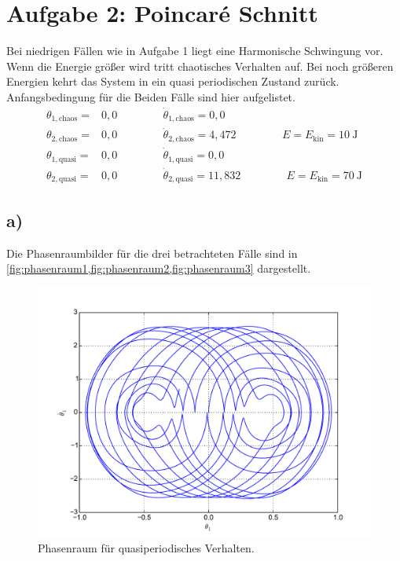 \section*{Aufgabe 2: Poincaré Schnitt}
Bei niedrigen Fällen wie in Aufgabe 1 liegt eine Harmonische Schwingung vor.
Wenn die Energie größer wird tritt chaotisches Verhalten auf.
Bei noch größeren Energien kehrt das System in ein quasi periodischen Zustand zurück.
Anfangsbedingung für die Beiden Fälle sind hier aufgelistet.
\begin{align}
	\theta_{1,\text{chaos}}=&0,0 \hspace{50pt} \dot{\theta}_{1,\text{chaos}}=0,0\nonumber\\
	\theta_{2,\text{chaos}}=&0,0 \hspace{50pt} \dot{\theta}_{2,\text{chaos}}=4,472\hspace{50pt}E=E_\text{kin}=\SI{10}{\joule}\\
	\theta_{1,\text{quasi}}=&0,0 \hspace{50pt} \dot{\theta}_{1,\text{quasi}}=0,0\nonumber\\
	\theta_{2,\text{quasi}}=&0,0 \hspace{50pt} \dot{\theta}_{2,\text{quasi}}=11,832\hspace{50pt}E=E_\text{kin}=\SI{70}{\joule}
\end{align}
\subsection*{a)}
Die Phasenraumbilder für die drei betrachteten Fälle sind in \cref{fig:phasenraum1,fig:phasenraum2,fig:phasenraum3} dargestellt.
\begin{figure}[h!]
	\includegraphics[width = \textwidth]{../Plots/Plot_2_A_1_Phasenraum.pdf}
	\caption{Phasenraum für quasiperiodisches Verhalten.\label{fig:phasenraum1}}
\end{figure}

